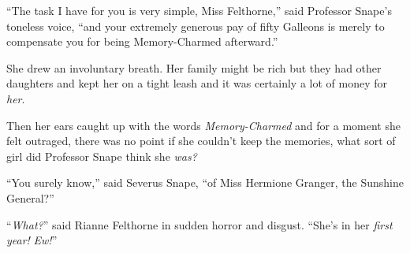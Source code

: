 ``The task I have for you is very simple, Miss Felthorne,'' said Professor Snape's toneless voice, ``and your extremely generous pay of fifty Galleons is merely to compensate you for being Memory-Charmed afterward.''

She drew an involuntary breath. Her family might be rich but they had other daughters and kept her on a tight leash and it was certainly a lot of money for \emph{her}.

Then her ears caught up with the words \emph{Memory-Charmed} and for a moment she felt outraged, there was no point if she couldn't keep the memories, what sort of girl did Professor Snape think she \emph{was?}

``You surely know,'' said Severus Snape, ``of Miss Hermione Granger, the Sunshine General?''

``\emph{What?}'' said Rianne Felthorne in sudden horror and disgust. ``She's in her \emph{first year!} \emph{Ew!}''
